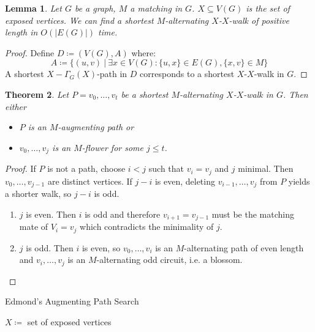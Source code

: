 \documentclass[11pt, a4paper]{article}
\newcommand{\abs}[1]{\left\lvert#1\right\rvert}
\newcommand{\set}[1]{\{#1\}}
\newtheorem{theorem}{Theorem}[section]
\newtheorem{lemma}[theorem]{Lemma}
\theoremstyle{remark}
\theoremstyle{definition}
\begin{document}
\begin{lemma}
Let $G$ be a graph, $M$ a matching in $G$. $X\subseteq V(G)$ is the set
of exposed vertices. We can find a shortest $M$-alternating $X$-$X$-walk
of positive length in $O(\abs{E(G)})$ time.
\end{lemma}
\begin{proof}
Define $D\coloneqq (V(G), A)$ where:
\[
	A\coloneqq\set{(u,v)\ |\ \exists
	x\in V(G): \set{u,x}\in E(G), \set{x,v}\in M}
\]
A shortest $X-\Gamma_G(X)$-path in $D$ corresponds to a shortest
$X$-$X$-walk in $G$.
\end{proof}

\begin{theorem}\label{thm:augmenting-path-blossom}
Let $P=v_0,\ldots,v_t$ be a shortest $M$-alternating $X$-$X$-walk in $G$.
Then either
\begin{itemize}
	\item $P$ is an $M$-augmenting path \emph{or}
	\item $v_0,\ldots,v_j$ is an $M$-flower for some $j\leq t$.
\end{itemize}
\end{theorem}
\begin{proof}
If $P$ is not a path, choose $i<j$ such that $v_i=v_j$ and $j$ minimal.
Then $v_0,\ldots,v_{j-1}$ are distinct vertices. If $j-i$ is even,
deleting $v_{i-1},\ldots,v_j$ from $P$ yields a shorter walk, so $j-i$
is odd.
\begin{enumerate}
\item[Case 1:] $j$ is even. Then $i$ is odd and therefore $v_{i+1}=v_{j-1}$
must be the matching mate of $V_i=v_j$ which contradicts the minimality of
$j$.
\item[Case 2:] $j$ is odd. Then $i$ is even, so $v_0,\ldots,v_i$ is an
$M$-alternating path of even length and $v_i,\ldots,v_j$ is an
$M$-alternating odd circuit, i.e. a blossom.
\end{enumerate}
\end{proof}

\begin{algorithm}
\caption{Edmond's Augmenting Path Search}
$X\coloneqq$ set of exposed vertices\;
\end{algorithm}
\end{document}
